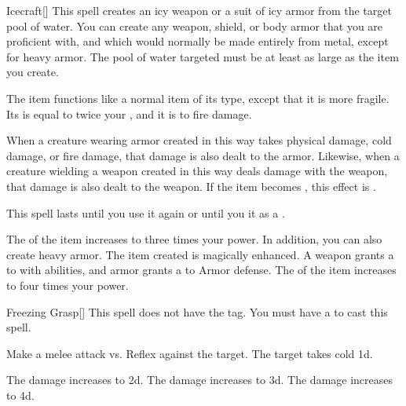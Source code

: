 \lowercase{\hypertarget{spell:Icecraft}{}}\label{spell:Icecraft}
\begin{freeability}[Rank 1]{\hypertarget{spell:Icecraft}{Icecraft}}[]
This spell creates an icy weapon or a suit of icy armor from the target pool of water.
You can create any weapon, shield, or body armor that you are proficient with, and which would normally be made entirely from metal, except for heavy armor.
The pool of water targeted must be at least as large as the item you create.

The item functions like a normal item of its type, except that it is more fragile.
Its  is equal to twice your , and it is  to fire damage.

When a creature wearing armor created in this way takes physical damage, cold damage, or fire damage, that damage is also dealt to the armor.
Likewise, when a creature wielding a weapon created in this way deals damage with the weapon, that damage is also dealt to the weapon.
If the item becomes , this effect is .

This spell lasts until you use it again or until you  it as a .

\rankline
{} The  of the item increases to three times your power.
In addition, you can also create heavy armor.
 The item created is magically enhanced.
A weapon grants a   to  with  abilities,
and armor grants a   to Armor defense.
 The  of the item increases to four times your power.
\end{freeability}
\vspace{0.25em}



\lowercase{\hypertarget{spell:Freezing Grasp}{}}\label{spell:Freezing Grasp}
\begin{freeability}[Rank 2]{\hypertarget{spell:Freezing Grasp}{Freezing Grasp}}[]
This spell does not have the  tag.
You must have a  to cast this spell.

Make a melee attack vs. Reflex against the target.
\hit The target takes cold  \plus1d.

\rankline
{} The damage increases to  \plus2d.
 The damage increases to  \plus3d.
 The damage increases to  \plus4d.
\end{freeability}
\vspace{0.25em}



